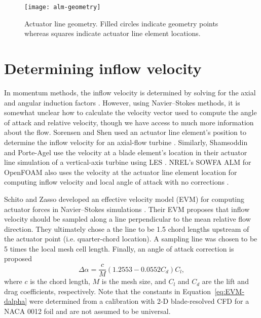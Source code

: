 \begin{figure}
    \centering
    
    \texttt{[image: alm-geometry]}
    
    \caption{Actuator line geometry. Filled circles indicate geometry points
        whereas squares indicate actuator line element locations.}
    
    \label{fig:AL-geom}
\end{figure}


\section{Determining inflow velocity}

In momentum methods, the inflow velocity is determined by solving for the axial
and angular induction factors \cite{Manwell2002}. However, using Navier--Stokes
methods, it is somewhat unclear how to calculate the velocity vector used to
compute the angle of attack and relative velocity, though we have access to much
more information about the flow. Sorensen and Shen used an actuator line
element's position to determine the inflow velocity for an axial-flow turbine
\cite{Sorensen2002}. Similarly, Shamsoddin and Porte-Agel use the velocity at a
blade element's location in their actuator line simulation of a vertical-axis
turbine using LES \cite{Shamsoddin2014}. NREL's SOWFA ALM for OpenFOAM also uses
the velocity at the actuator line element location for computing inflow velocity
and local angle of attack with no corrections \cite{Churchfield2013}.

Schito and Zasso developed an effective velocity model (EVM) for computing
actuator forces in Navier--Stokes simulations \cite{Schito2014}. Their EVM
proposes that inflow velocity should be sampled along a line perpendicular to
the mean relative flow direction. They ultimately chose a the line to be 1.5
chord lengths upstream of the actuator point (i.e. quarter-chord location). A
sampling line was chosen to be 5 times the local mesh cell length. Finally, an
angle of attack correction is proposed
\begin{equation}
    \Delta \alpha = \frac{c}{M} (1.2553 - 0.0552 C_d) C_l,
    \label{eq:EVM-dalpha}
\end{equation}
where $c$ is the chord length, $M$ is the mesh size, and $C_l$ and $C_d$ are the
lift and drag coefficients, respectively. Note that the constants in
Equation~\ref{eq:EVM-dalpha} were determined from a calibration with 2-D
blade-resolved CFD for a NACA 0012 foil and are not assumed to be universal.

